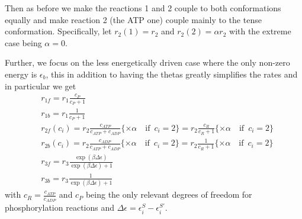 \documentclass[11pt]{article}
\begin{document}
Then as before we make the reactions 1 and 2 couple to both conformations equally and make reaction 2 (the ATP one) couple mainly to the tense conformation.
Specifically, let $r_2(1) = r_2$ and $r_2(2) = \alpha r_2$ with the extreme case being $\alpha = 0$.

Further, we focus on the less energetically driven case where the only non-zero energy is $\epsilon_b$, this in addition to having the thetas greatly simplifies the rates and in particular we get
\begin{align}
    & r_{1f} = r_1 \frac{c_P}{c_P + 1} \\
    & r_{1b} = r_1 \frac{1}{c_P + 1} \\
    & r_{2f}(c_i) = r_2 \frac{c_{ATP}}{c_{ATP} + c_{ADP}} \{\times \alpha \quad\text{if}\enspace c_i =2\} = r_2 \frac{c_R}{c_R + 1} \{\times \alpha \quad\text{if}\enspace c_i =2\} \\
    & r_{2b}(c_i) = r_2 \frac{c_{ADP}}{c_{ATP} + c_{ADP}} \{\times \alpha \quad\text{if}\enspace c_i =2\} = r_2 \frac{1}{c_R + 1} \{\times \alpha \quad\text{if}\enspace c_i =2\} \\
    & r_{3f} = r_3 \frac{\exp(\beta\Delta\epsilon)}{\exp(\beta\Delta\epsilon) + 1} \\
    & r_{3b} = r_3 \frac{1}{\exp(\beta\Delta\epsilon) + 1}
\end{align}
with $c_R = \frac{c_{ATP}}{c_{ADP}}$ and $c_P$ being the only relevant degrees of freedom for phosphorylation reactions and $\Delta\epsilon=\epsilon_i^S-\epsilon_i^{S'}$.
\end{document}
